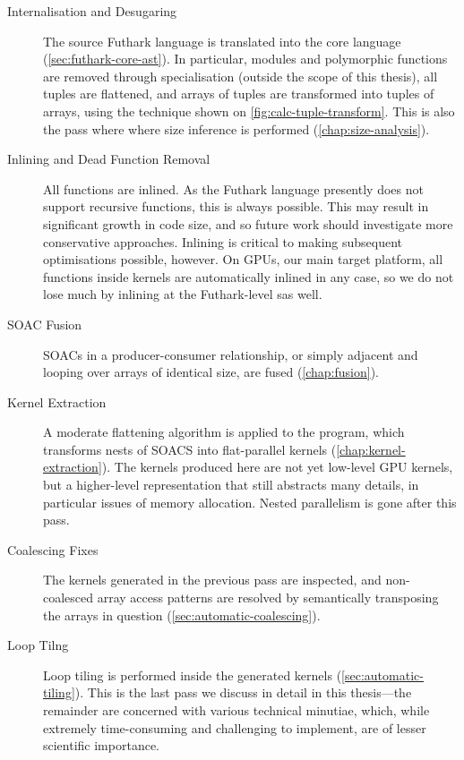 \begin{description}
\item[Internalisation and Desugaring] The source Futhark language is
  translated into the core language (\cref{sec:futhark-core-ast}).  In
  particular, modules and polymorphic functions are removed through
  specialisation (outside the scope of this thesis), all tuples are
  flattened, and arrays of tuples are transformed into tuples of
  arrays, using the technique shown on \ref{fig:calc-tuple-transform}.
  This is also the pass where where size inference is performed
  (\cref{chap:size-analysis}).

\item[Inlining and Dead Function Removal] All functions are
inlined.  As the Futhark language presently does not support recursive
functions, this is always possible.  This may result in significant
growth in code size, and so future work should investigate more
conservative approaches.  Inlining is critical to making subsequent
optimisations possible, however.  On GPUs, our main target platform,
all functions inside kernels are automatically inlined in any case, so
we do not lose much by inlining at the Futhark-level sas well.

\item[SOAC Fusion] SOACs in a producer-consumer relationship, or
simply adjacent and looping over arrays of identical size, are fused
(\cref{chap:fusion}).

\item[Kernel Extraction] A moderate flattening algorithm is
applied to the program, which transforms nests of SOACS into
flat-parallel kernels (\cref{chap:kernel-extraction}).  The kernels
produced here are not yet low-level GPU kernels, but a higher-level
representation that still abstracts many details, in particular issues
of memory allocation.  Nested parallelism is gone after this pass.

\item[Coalescing Fixes] The kernels generated in the previous
pass are inspected, and non-coalesced array access patterns are
resolved by semantically transposing the arrays in question
(\cref{sec:automatic-coalescing}).

\item[Loop Tilng] Loop tiling is performed inside the generated
kernels (\cref{sec:automatic-tiling}).  This is the last pass we
discuss in detail in this thesis---the remainder are concerned with
various technical minutiae, which, while extremely time-consuming and
challenging to implement, are of lesser scientific importance.


\end{description}
